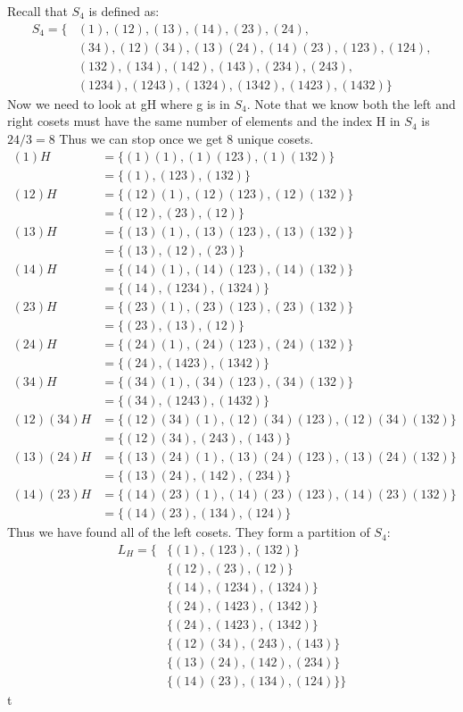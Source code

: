 \documentclass[a4paper, 11pt]{article}
\begin{document}
Recall that $S_4$ is defined as: 
	\begin{align*}
		S_4 = \{&(1), (12), (13), (14), (23), (24), \\
		 &(34), (12)(34), (13)(24), (14)(23), (123), (124), \\
		 & (132), (134), (142), (143), (234), (243), \\
		 & (1234), (1243), (1324), (1342), (1423), (1432)\}
	\end{align*}
Now we need to look at gH where g is in $S_4$. Note that we know both the left and right cosets must have the same number of elements and the index H in $S_4$ is $24/3 = 8$ Thus we can stop once we get 8 unique cosets. 
	\begin{align*}
		(1)H 		&= \{(1)(1), (1)(123), (1)(132)\} \\ 
					&= \{(1), (123), (132)\} \\ 
		(12)H 		&= \{(12)(1), (12)(123), (12)(132)\} \\ 
					&= \{(12), (23), (12)\} \\ 
		(13)H		&= \{(13)(1), (13)(123), (13)(132)\} \\ 
					&= \{(13), (12), (23)\} \\ 
		(14)H 		&= \{(14)(1), (14)(123), (14)(132)\} \\ 
					&= \{(14), (1234), (1324)\} \\ 
		(23)H		&= \{(23)(1), (23)(123), (23)(132)\} \\ 
					&= \{(23), (13), (12)\} \\ 
		(24)H		&= \{(24)(1), (24)(123), (24)(132)\} \\ 
					&= \{(24), (1423), (1342)\} \\ 
		(34)H 		&= \{(34)(1), (34)(123), (34)(132)\} \\ 
					&= \{(34), (1243),(1432)\} \\ 
		(12)(34)H	&= \{(12)(34)(1), (12)(34)(123), (12)(34)(132)\} \\ 
					&= \{(12)(34), (243), (143)\} \\ 
		(13)(24)H	&= \{(13)(24)(1), (13)(24)(123), (13)(24)(132)\} \\ 
					&= \{(13)(24), (142), (234)\} \\ 
		(14)(23)H	&= \{(14)(23)(1), (14)(23)(123), (14)(23)(132)\} \\ 
					&= \{(14)(23), (134), (124)\}
 	\end{align*}
Thus we have found all of the left cosets. They form a partition of $S_4$: 
	\begin{align*}
		L_H = \{&\{(1), (123), (132)\}\\
				&\{(12), (23), (12)\} \\ 
				&\{(14), (1234), (1324)\} \\  
				&\{(24), (1423), (1342)\} \\ 
				&\{(24), (1423), (1342)\} \\ 
				&\{(12)(34), (243), (143)\} \\ 
				&\{(13)(24), (142), (234)\} \\ 
				&\{(14)(23), (134), (124)\}	\}
	\end{align*}t
\end{document}
